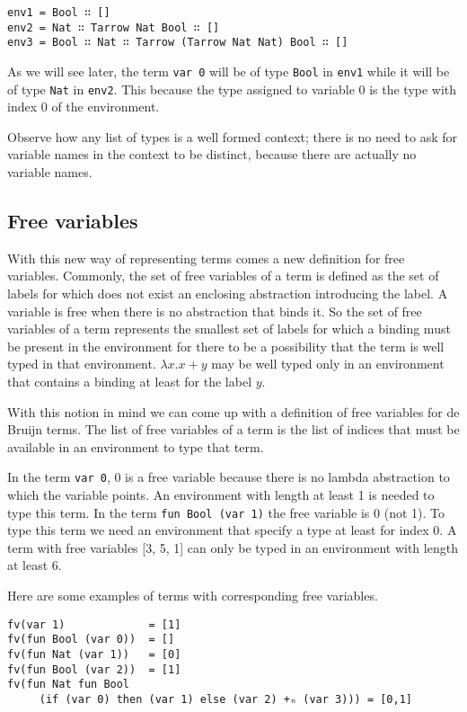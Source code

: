 \documentclass{article}
\begin{document}
\begin{verbatim}
env1 = Bool ∷ []
env2 = Nat ∷ Tarrow Nat Bool ∷ []
env3 = Bool ∷ Nat ∷ Tarrow (Tarrow Nat Nat) Bool ∷ []
\end{verbatim}

As we will see later, the term \texttt{var 0} will be of type \texttt{Bool} in \texttt{env1} while it will be of type \texttt{Nat} in \texttt{env2}.
This because the type assigned to variable 0 is the type with index 0 of the environment.

Observe how any list of types is a well formed context; there is no need to ask for variable names in the context to be distinct, because there are actually no variable names.


\subsection{Free variables}

With this new way of representing terms comes a new definition for free variables.
Commonly, the set of free variables of a term is defined as the set of labels for which does not exist an enclosing abstraction introducing the label.
A variable is free when there is no abstraction that binds it.
So the set of free variables of a term represents the smallest set of labels for which a binding must be present in the environment for there to be a possibility that the term is well typed in that environment.
$\lambda x. x + y$ may be well typed only in an environment that contains a binding at least for the label $y$.

With this notion in mind we can come up with a definition of free variables for de Bruijn terms.
The list of free variables of a term is the list of indices that must be available in an environment to type that term.

In the term \texttt{var 0}, 0 is a free variable because there is no lambda abstraction to which the variable points.
An environment with length at least 1 is needed to type this term.
In the term \texttt{fun Bool (var 1)} the free variable is 0 (not 1).
To type this term we need an environment that specify a type at least for index 0.
A term with free variables [3, 5, 1] can only be typed in an environment with length at least 6.

Here are some examples of terms with corresponding free variables.

\begin{verbatim}
fv(var 1)             = [1]
fv(fun Bool (var 0))  = []
fv(fun Nat (var 1))   = [0]
fv(fun Bool (var 2))  = [1]
fv(fun Nat fun Bool
     (if (var 0) then (var 1) else (var 2) +ₙ (var 3))) = [0,1]
\end{verbatim}
\end{document}
